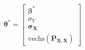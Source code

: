\begin{equation}
	\boldsymbol{\theta}^{\ast}
	=
	\left[
		\begin{array}{c}
			\boldsymbol{\beta}^{\ast}                                         \\
			\sigma_{Y}                                                        \\
			\boldsymbol{\sigma}_{\mathbf{X}}                                  \\
			\mathrm{vechs} \left( \mathbf{P}_{\mathbf{X}, \mathbf{X}} \right) 
		\end{array}
	\right]
	\label{eq:strRegression-thetastar}
\end{equation}
